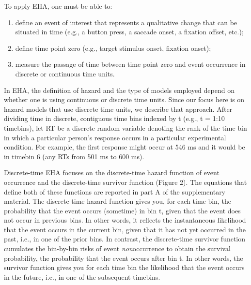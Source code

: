 \documentclass[
  man, donotrepeattitle,floatsintext]{apa6}
\begin{document}
To apply EHA, one must be able to:

\begin{enumerate}
\def\labelenumi{\arabic{enumi}.}
\item
  define an event of interest that represents a qualitative change that can be situated in time (e.g., a button press, a saccade onset, a fixation offset, etc.);
\item
  define time point zero (e.g., target stimulus onset, fixation onset);
\item
  measure the passage of time between time point zero and event occurrence in discrete or continuous time units.
\end{enumerate}

In EHA, the definition of hazard and the type of models employed depend on whether one is using continuous or discrete time units. Since our focus here is on hazard models that use discrete time units, we describe that approach. After dividing time in discrete, contiguous time bins indexed by t (e.g., t = 1:10 timebins), let RT be a discrete random variable denoting the rank of the time bin in which a particular person's response occurs in a particular experimental condition. For example, the first response might occur at 546 ms and it would be in timebin 6 (any RTs from 501 ms to 600 ms).

Discrete-time EHA focuses on the discrete-time hazard function of event occurrence and the discrete-time survivor function (Figure 2). The equations that define both of these functions are reported in part A of the supplementary material. The discrete-time hazard function gives you, for each time bin, the probability that the event occurs (sometime) in bin t, given that the event does not occur in previous bins. In other words, it reflects the instantaneous likelihood that the event occurs in the current bin, given that it has not yet occurred in the past, i.e., in one of the prior bins. In contrast, the discrete-time survivor function cumulates the bin-by-bin risks of event \emph{non}occurrence to obtain the survival probability, the probability that the event occurs after bin t. In other words, the survivor function gives you for each time bin the likelihood that the event occurs in the future, i.e., in one of the subsequent timebins.
\end{document}
